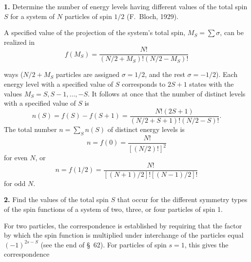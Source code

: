 \ProblemHeading

\textbf{1.} Determine the number of energy levels having different values of the total spin $S$ for a system of $N$ particles of spin $1/2$ (F.~Bloch, 1929).

\SolutionHeading A specified value of the projection of the system's total spin, $M_S=\sum\sigma$, can be realized in
\[
 f(M_S)=\frac{N!}{(N/2+M_S)!(N/2-M_S)!}
\]

ways ($N/2+M_S$ particles are assigned $\sigma=1/2$, and the rest $\sigma=-1/2$). Each energy level with a specified value of $S$ corresponds to $2S+1$ states with the values $M_S=S,S-1,\ldots,-S$. It follows at once that the number of distinct levels with a specified value of $S$ is
\[
 n(S)=f(S)-f(S+1)=\frac{N!(2S+1)}{(N/2+S+1)!(N/2-S)!}.
\]
The total number $n=\sum_S n(S)$ of distinct energy levels is
\[
 n=f(0)=\frac{N!}{[(N/2)!]^2}
\]
for even $N$, or
\[
 n=f(1/2)=\frac{N!}{[(N+1)/2]![(N-1)/2]!}
\]
for odd $N$.

\textbf{2.} Find the values of the total spin $S$ that occur for the different symmetry types of the spin functions of a system of two, three, or four particles of spin 1.

\SolutionHeading For two particles, the correspondence is established by requiring that the factor by which the spin function is multiplied under interchange of the particles equal $(-1)^{2s-S}$ (see the end of §~62). For particles of spin $s=1$, this gives the correspondence
\begin{center}
\end{center}

